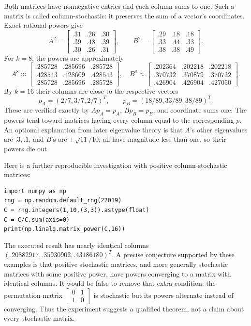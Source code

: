 Both matrices have nonnegative entries and each column sums to one.
Such a matrix is called column-stochastic: it preserves the sum of a
vector's coordinates. Exact rational powers give
\[
 A^2=\begin{bmatrix}.31&.26&.30\\.39&.48&.39\\.30&.26&.31\end{bmatrix},\qquad
 B^2=\begin{bmatrix}.29&.18&.18\\.33&.44&.33\\.38&.38&.49\end{bmatrix}.
\]
For $k=8$, the powers are approximately
\[
 A^8\approx\begin{bmatrix}.285728&.285696&.285728\\
 .428543&.428609&.428543\\.285728&.285696&.285728\end{bmatrix},\quad
 B^8\approx\begin{bmatrix}.202364&.202218&.202218\\
 .370732&.370879&.370732\\.426904&.426904&.427050\end{bmatrix}.
\]
By $k=16$ their columns are close to the respective vectors
\[
 p_A=(2/7,3/7,2/7)^T,\qquad p_B=(18/89,33/89,38/89)^T.
\]
These are verified exactly by $Ap_A=p_A$, $Bp_B=p_B$, and coordinate sums one.
The powers tend toward matrices having every column equal to the corresponding
$p$. An optional explanation from later eigenvalue theory is that $A$'s
other eigenvalues are $.3,.1$, and $B$'s are $\pm\sqrt{11}/10$;
all have magnitude less than one, so their powers die out.

Here is a further reproducible investigation with positive column-stochastic
matrices:
\begin{verbatim}
import numpy as np
rng = np.random.default_rng(22019)
C = rng.integers(1,10,(3,3)).astype(float)
C = C/C.sum(axis=0)
print(np.linalg.matrix_power(C,16))
\end{verbatim}
The executed result has nearly identical columns
$(.20882917,.35930902,.43186180)^T$.
A precise conjecture supported by these examples is that positive stochastic
matrices, and more generally stochastic matrices with some positive power,
have powers converging to a matrix with identical columns.
It would be false to remove that extra condition: the permutation matrix
$\begin{bmatrix}0&1\\1&0\end{bmatrix}$ is stochastic but its powers alternate
instead of converging. Thus the experiment suggests a qualified theorem,
not a claim about every stochastic matrix.

